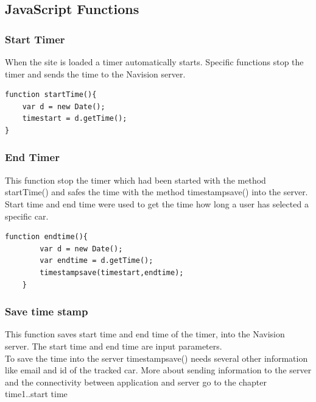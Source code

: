 \subsection{JavaScript Functions}



\subsubsection{Start Timer}
When the site is loaded a timer automatically starts. Specific functions stop the timer and sends the time to the Navision server.
\\
\begin{lstlisting}[language=html, caption= 
start timer function,captionpos=b]
function startTime(){
	var d = new Date();
	timestart = d.getTime();
}
\end{lstlisting}

\subsubsection{End Timer}
This function stop the timer which had been started with the method startTime() and safes the time with the method timestampsave() into the server. Start time and end time were used to get the time how long a user has selected a specific car.
\\
\begin{lstlisting}[language=html, caption= 
start timer function,captionpos=b]
function endtime(){
        var d = new Date();
        var endtime = d.getTime();
        timestampsave(timestart,endtime);
    }
\end{lstlisting}


\subsubsection{Save time stamp}
This function saves start time and end time of the timer, into the Navision server. The start time and end time are input parameters. 
\\

To save the time into the server timestampsave() needs several other information like email and id of the tracked car. More about sending information to the server and the connectivity between application and server go to the chapter
\\

time1..start time

